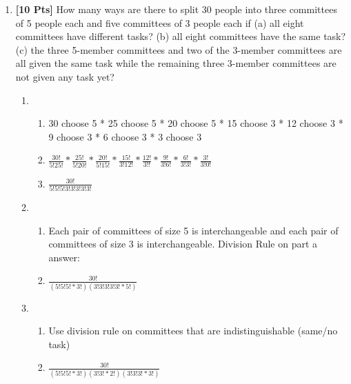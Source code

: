 \documentclass[11pt]{article}
\begin{document}
\begin{enumerate}
        \item {\bf [10 Pts]} How many ways are there to split 30 people into three committees of 5 people each and five committees of 3 people each if (a) all eight committees have different tasks? (b) all eight committees have the same task? (c) the three 5-member committees and two of the 3-member committees are all given the same task while the remaining three 3-member committees are not given any task yet?
        \begin{enumerate}
            \item
            \begin{enumerate}
                \item 30 choose 5 * 25 choose 5 * 20 choose 5 * 15 choose 3 * 12 choose 3 * 9 choose 3 * 6 choose 3 * 3 choose 3
                \item $\frac{30!}{5!25!} * \frac{25!}{5!20!} * \frac{20!}{5!15!} * \frac{15!}{3!12!} * \frac{12!}{3!!} * \frac{9!}{3!6!} * \frac{6!}{3!3!} * \frac{3!}{3!0!}$
                \item $\frac{30!}{5!5!5!3!3!3!3!3!}$
            \end{enumerate}
            \item
            \begin{enumerate}
                \item Each pair of committees of size 5 is interchangeable and each pair of committees of size 3 is interchangeable. Division Rule on part a answer:
                \item $\frac{30!}{(5!5!5! * 3!)(3!3!3!3!3! * 5!)}$
            \end{enumerate}
            \item
            \begin{enumerate}
                \item Use division rule on committees that are indistinguishable (same/no task)
                \item $\frac{30!}{(5!5!5! * 3!)(3!3! * 2!)(3!3!3! * 3!)}$
            \end{enumerate}
        \end{enumerate}


\end{enumerate}
\end{document}
